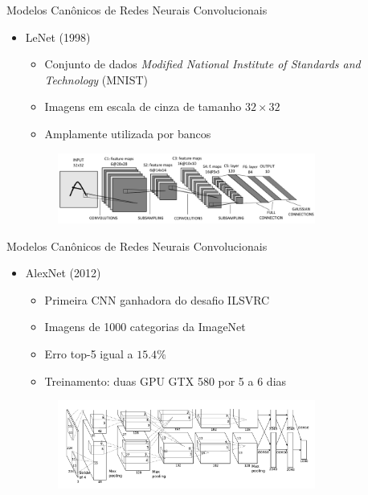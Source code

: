 \begin{frame}{\LARGE{Modelos Canônicos de Redes Neurais Convolucionais}}
   \ \  \\[0.1cm]
   \begin{itemize}
     \item LeNet (1998)
     \begin{itemize}
       \item Conjunto de dados \emph{Modified National Institute of Standards and Technology} (MNIST)
       \item Imagens em escala de cinza de tamanho $32 \times 32$
       \item Amplamente utilizada por bancos
     \end{itemize}
     \begin{figure}
          \centering
          \includegraphics[width=0.8\textwidth]{img/LENET5}
     \end{figure}
   \end{itemize}
\end{frame}

\begin{frame}{\LARGE{Modelos Canônicos de Redes Neurais Convolucionais}}
   \ \  \\[0.1cm]
   \begin{itemize}
     \item AlexNet (2012)
     \begin{itemize}
       \item Primeira CNN ganhadora do desafio ILSVRC
       \item Imagens de 1000 categorias da ImageNet
       \item Erro top-5 igual a $15.4\%$
       \item Treinamento: duas GPU GTX 580 por 5 a 6 dias
 \end{itemize}
     \begin{figure}
          \centering
          \includegraphics[width=0.8\textwidth]{img/alexnet}
     \end{figure}
   \end{itemize}
\end{frame}

